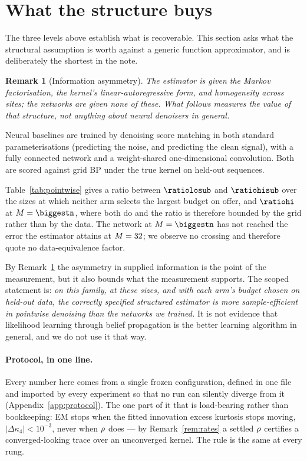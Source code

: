 \documentclass{article}
\newtheorem{remark}{Remark}
\begin{document}
\section{What the structure buys}
\label{sec:networks}

The three levels above establish what is recoverable. This section asks what the structural
assumption is worth against a generic function approximator, and is deliberately the shortest in
the note.

\begin{remark}[Information asymmetry]
\label{rem:asymmetry}
The estimator is given the Markov factorisation, the kernel's linear-autoregressive form, and
homogeneity across sites; the networks are given none of these. What follows measures the value of
that structure, not anything about neural denoisers in general.
\end{remark}

\noindent
Neural baselines are trained by denoising score matching in both standard parameterisations
(predicting the noise, and predicting the clean signal), with a fully connected network and a
weight-shared one-dimensional convolution. Both are scored against grid BP under the true kernel
on held-out sequences.



Table~\ref{tab:pointwise} gives a ratio between $\ratiolosub$ and $\ratiohisub$ over the
\nsizessub{} sizes at which neither arm selects the largest budget on offer, and $\ratiohi$ at
$\nseq=\biggestn$, where both do and the ratio is therefore bounded by the grid rather than by the
data. The network at $\nseq=\biggestn$ has not reached the error the estimator attains at
$M=32$; we observe no crossing and therefore quote no data-equivalence factor.

By Remark~\ref{rem:asymmetry} the asymmetry in supplied information is the point of the
measurement, but it also bounds what the measurement supports. The scoped statement is: \emph{on
this family, at these sizes, and with each arm's budget chosen on held-out data, the correctly
specified structured estimator is more sample-efficient in pointwise denoising than the networks we
trained.} It is not evidence that likelihood learning through belief propagation is the better
learning algorithm in general, and we do not use it that way.



\noindent
\paragraph{Protocol, in one line.} Every number here comes from a single frozen configuration,
defined in one file and imported by every experiment so that no run can silently diverge from it
(Appendix~\ref{app:protocol}). The one part of it that is load-bearing rather than bookkeeping:
EM stops when the fitted innovation excess kurtosis stops moving, $|\Delta\kappa_4|<10^{-3}$, never
when $\rho$ does --- by Remark~\ref{rem:rates} a settled $\rho$ certifies a converged-looking
trace over an unconverged kernel. The rule is the same at every rung.
\end{document}
